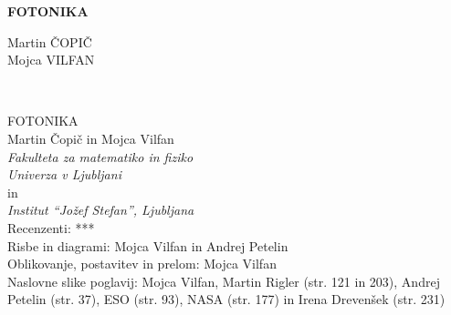 \documentclass[11pt,fleqn]{book} %
\begin{document}
\let\cleardoublepage\clearpage
\makeatletter
\setlength{\@fptop}{0pt}
\makeatother




\begingroup
\thispagestyle{empty}
\centering
\vspace*{5cm}
\par\normalfont\fontsize{35}{35}\sffamily\selectfont
\textbf{FOTONIKA}\\
{\LARGE }\par %
\vspace*{1cm}
\vspace*{1cm}
\vspace*{8cm}
{\Large Martin ČOPIČ \\Mojca VILFAN \\}\par %
\endgroup


\newpage
~\vfill
\thispagestyle{empty}

FOTONIKA \\

Martin Čopič in Mojca Vilfan\\
{\it Fakulteta za matematiko in fiziko\\
Univerza v Ljubljani}\\
in\\
{\it Institut ``Jožef Stefan'', Ljubljana}\\
 
 Recenzenti: {***}\\ %


 Risbe in diagrami: Mojca Vilfan in Andrej Petelin\\ %
 
 Oblikovanje, postavitev in prelom: Mojca Vilfan \\ %

 Naslovne slike poglavij: Mojca Vilfan, Martin Rigler (str. 121 in 203), Andrej Petelin (str. 37),
 ESO (str. 93), NASA (str. 177) in Irena Drevenšek (str. 231)\\ %
\end{document}
